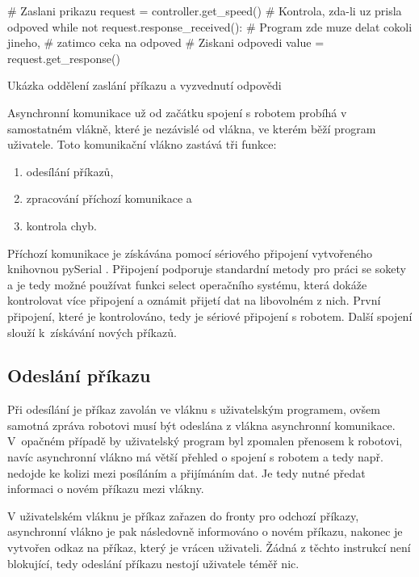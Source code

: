     \begin{listing}[H]
    \begin{pyc}
# Zaslani prikazu
request = controller.get_speed()
# Kontrola, zda-li uz prisla odpoved
while not request.response_received():
    # Program zde muze delat cokoli jineho,
    # zatimco ceka na odpoved
# Ziskani odpovedi
value = request.get_response()
    \end{pyc}
    \caption{Ukázka oddělení zaslání příkazu a vyzvednutí odpovědi}
    \label{lst:oddeleni}
    \end{listing}

    Asynchronní komunikace už od začátku spojení s robotem probíhá v
    samostatném vlákně, které je nezávislé od vlákna, ve kterém běží program
    uživatele. Toto komunikační vlákno zastává tři funkce:

    \begin{enumerate}
        \item odesílání příkazů,
        \item zpracování příchozí komunikace a
        \item kontrola chyb.
    \end{enumerate}

    Příchozí komunikace je získávána pomocí sériového připojení vytvořeného
    knihovnou pySerial \cite{pyserial}. Připojení podporuje standardní metody
    pro práci se sokety a je tedy možné používat funkci select operačního
    systému, která dokáže kontrolovat více připojení a oznámit přijetí dat na
    libovolném z nich. První připojení, které je kontrolováno, tedy je sériové
    připojení s robotem. Další spojení slouží k~získávání nových příkazů.

    \subsection{Odeslání příkazu}

    Při odesílání je příkaz zavolán ve vláknu s uživatelským programem, ovšem
    samotná zpráva robotovi musí být odeslána z vlákna asynchronní komunikace.
    V~opačném případě by uživatelský program byl zpomalen přenosem k robotovi,
    navíc asynchronní vlákno má větší přehled o spojení s robotem a tedy např.
    nedojde ke kolizi mezi posíláním a přijímáním dat. Je tedy nutné předat
    informaci o novém příkazu mezi vlákny.

    V uživatelském vláknu je příkaz zařazen do fronty pro odchozí příkazy,
    asynchronní vlákno je pak následovně informováno o novém příkazu, nakonec
    je vytvořen odkaz na příkaz, který je vrácen uživateli. Žádná z těchto
    instrukcí není blokující, tedy odeslání příkazu nestojí uživatele téměř
    nic.


